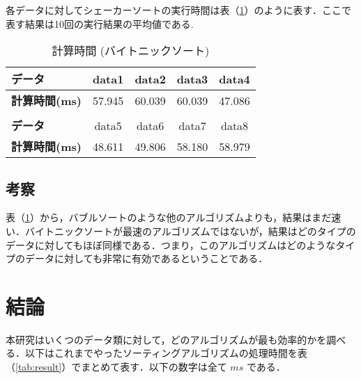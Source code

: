 \documentclass[a4j, titlepage]{jarticle}
\begin{document}
            各データに対してシェーカーソートの実行時間は表（\ref{tab:bitonic}）のように表す．ここで表す結果は10回の実行結果の平均値である.

            \begin{table}[tbh]
                \caption{計算時間 (バイトニックソート)}
                \label{tab:bitonic}
                \begin{center}
                    \begin{tabular}{lcccc}
                        \hline
                        \textbf{データ} & data1 & data2 &data3 &data4 \\ \hline
                        \textbf{計算時間(ms)} & 57.945 & 60.039 & 60.039 & 47.086 \\ \hline
                        \\ \hline
                        \textbf{データ} & data5 &data6 &data7 &data8\\ \hline
                        \textbf{計算時間(ms)} & 48.611 & 49.806 & 58.180 & 58.979 \\ \hline
                    \end{tabular}
                \end{center}
            \end{table}
        
        \subsection{考察}
            表（\ref{tab:bitonic}）から，バブルソートのような他のアルゴリズムよりも，結果はまだ速い．バイトニックソートが最速のアルゴリズムではないが，結果はどのタイプのデータに対してもほぼ同様である．つまり，このアルゴリズムはどのようなタイプのデータに対しても非常に有効であるということである．

        
    \section{結論}
        本研究はいくつのデータ類に対して，どのアルゴリズムが最も効率的かを調べる．以下はこれまでやったソーティングアルゴリズムの処理時間を表（\ref{tab:result}）でまとめて表す．以下の数字は全て $ms$ である．
\end{document}
